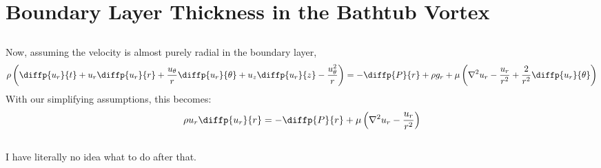 \documentclass{article}
\begin{document}
\section{Boundary Layer Thickness in the Bathtub Vortex}

\subsection{}
Now, assuming the velocity is almost purely radial in the boundary layer,
\[\rho \left(\diffp{u_r}{t} + u_r \diffp{u_r}{r} + \frac{u_\theta}{r} \diffp{u_r}{\theta} + u_z \diffp{u_r}{z} - \frac{u_\theta^2}{r}\right) = -\diffp{P}{r} + \rho g_r  + \mu\left(\nabla^2 u_r - \frac{u_r}{r^2} + \frac{2}{r^2}\diffp{u_r}{\theta}\right)\]
With our simplifying assumptions, this becomes:
\[\rho u_r \diffp{u_r}{r} = - \diffp{P}{r} + \mu \left(\nabla^2 u_r - \frac{u_r}{r^2}\right)\]
\subsection{}
I have literally no idea what to do after that.
\subsection{}
\subsection{}
\subsection{}
\end{document}
